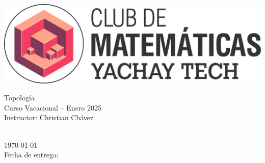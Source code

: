 




    




\begin{center}
\begin{minipage}{0.45\textwidth}
    \includegraphics[height=0.075\textheight]{images/LogoClubMate.pdf}
\end{minipage}%
\hfill
\begin{minipage}{0.5\textwidth}
    \begin{flushright}
        {\LARGE Topología} \\ Curso Vacacional -- Enero 2025 \\
        Instructor: Christian Chávez \\
    \end{flushright}
\end{minipage}

\vspace{\baselineskip}
{\huge\thetitle} \\

\today\\
Fecha de entrega: \fechaentrega{}

\end{center}
